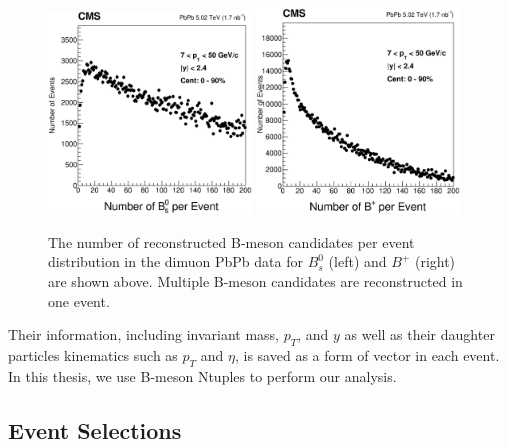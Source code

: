 \begin{figure}[h]
\begin{center}
\includegraphics[width= 0.48\textwidth]{Figures/Chapter4/BsSize.eps}
\includegraphics[width= 0.48\textwidth]{Figures/Chapter4/BPSize.eps}
\caption{The number of reconstructed B-meson candidates per event distribution in the dimuon PbPb data for $B^0_s$ (left) and $B^+$ (right) are shown above. Multiple B-meson candidates are reconstructed in one event.}
\label{BCand}
\end{center}
\end{figure}


Their information, including invariant mass, $p_T$, and $y$ as well as their daughter particles kinematics such as $p_T$ and $\eta$, is saved as a form of vector in each event. In this thesis, we use B-meson Ntuples to perform our analysis.




\subsection{Event Selections}

